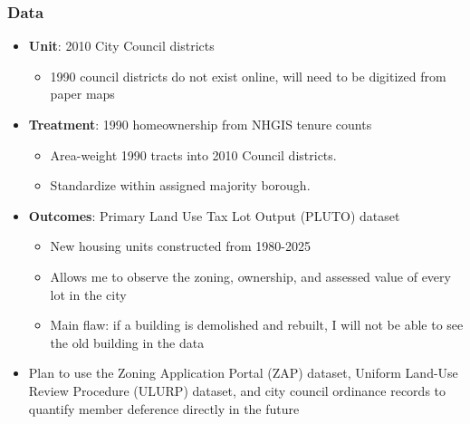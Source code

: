 
\begin{frame}[t]
    \frametitle{Data}
    \small

    \begin{itemize}
        \item \textbf{Unit}: 2010 City Council districts
        \begin{itemize}
            \footnotesize
            \item 1990 council districts do not exist online, will need to be digitized from paper maps
        \end{itemize}

        \item \textbf{Treatment}: 1990 homeownership from NHGIS tenure counts
        \begin{itemize}
            \footnotesize
            \item Area-weight 1990 tracts into 2010 Council districts.
            \item Standardize within assigned majority borough.
        \end{itemize}

        \item \textbf{Outcomes}: Primary Land Use Tax Lot Output (PLUTO) dataset
        \begin{itemize}
            \footnotesize
            \item New housing units constructed from 1980-2025
            \item Allows me to observe the zoning, ownership, and assessed value of every lot in the city
            \item Main flaw: if a building is demolished and rebuilt, I will not be able to see the old building in the data
        \end{itemize}
        \item Plan to use the Zoning Application Portal (ZAP) dataset, Uniform Land-Use Review Procedure (ULURP) dataset, and city council ordinance records
        to quantify member deference directly in the future
    \end{itemize}
\end{frame}

